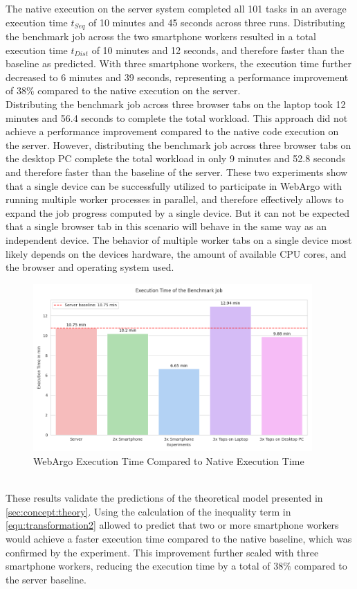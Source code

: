 The native execution on the server system completed all 101 tasks in an average execution time $t_{Seq}$ of 10 minutes and 45 seconds across three runs. Distributing the benchmark job across the two smartphone workers resulted in a total execution time $t_{Dist}$ of 10 minutes and 12 seconds, and therefore faster than the baseline as predicted. With three smartphone workers, the execution time further decreased to 6 minutes and 39 seconds, representing a performance improvement of 38\% compared to the native execution on the server.
~\\
Distributing the benchmark job across three browser tabs on the laptop took 12 minutes and 56.4 seconds to complete the total workload. This approach did not achieve a performance improvement compared to the native code execution on the server. However, distributing the benchmark job across three browser tabs on the desktop \ac{PC} complete the total workload in only 9 minutes and 52.8 seconds and therefore faster than the baseline of the server. These two experiments show that a single device can be successfully utilized to participate in WebArgo with running multiple worker processes in parallel, and therefore effectively allows to expand the job progress computed by a single device. But it can not be expected that a single browser tab in this scenario will behave in the same way as an independent device. The behavior of multiple worker tabs on a single device most likely depends on the devices hardware, the amount of available \acs{CPU} cores, and the browser and operating system used.
\begin{figure}[htbp]
    \centering
    \includegraphics[width=0.95\textwidth]{gfx/figures/Evaluation_A.png}
    \caption{WebArgo Execution Time Compared to Native Execution Time}
    \label{fig:evaluation:experiment-A}
\end{figure}
~\\
These results validate the predictions of the theoretical model presented in \autoref{sec:concept:theory}. Using the calculation of the inequality term in \eqref{equ:transformation2} allowed to predict that two or more smartphone workers would achieve a faster execution time compared to the native baseline, which was confirmed by the experiment. This improvement further scaled with three smartphone workers, reducing the execution time by a total of 38\% compared to the server baseline.

